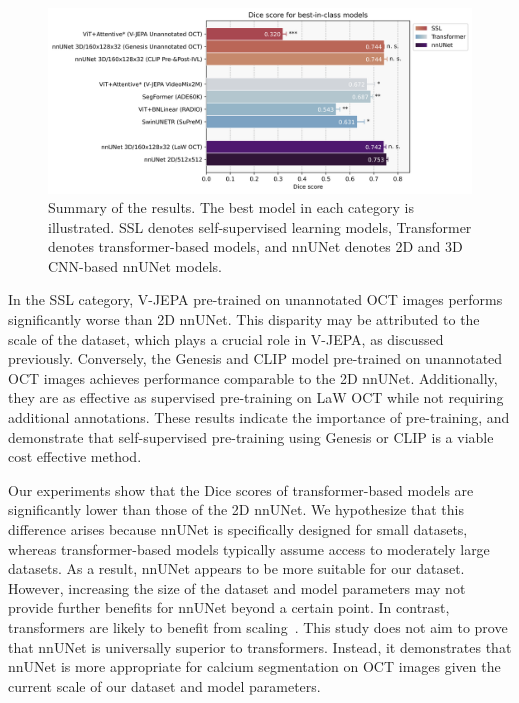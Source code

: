\documentclass[a4paper,11pt,oneside]{report}
\begin{document}
\begin{figure}[hbt]
    \centering
    \includegraphics[width=1\textwidth]{figures/result_best_in_class_results.png}
    \caption{Summary of the results. The best model in each category is illustrated. SSL denotes self-supervised learning models, Transformer denotes transformer-based models, and nnUNet denotes 2D and 3D CNN-based nnUNet models.}
    \label{fig:results}
\end{figure}

In the SSL category, V-JEPA pre-trained on unannotated OCT images performs significantly worse than 2D nnUNet. This disparity may be attributed to the scale of the dataset, which plays a crucial role in V-JEPA, as discussed previously. Conversely, the Genesis and CLIP model pre-trained on unannotated OCT images achieves performance comparable to the 2D nnUNet. Additionally, they are as effective as supervised pre-training on LaW OCT while not requiring additional annotations. These results indicate the importance of pre-training, and demonstrate that self-supervised pre-training using Genesis or CLIP is a viable cost effective method.

Our experiments show that the Dice scores of transformer-based models are significantly lower than those of the 2D nnUNet. We hypothesize that this difference arises because nnUNet is specifically designed for small datasets, whereas transformer-based models typically assume access to moderately large datasets. As a result, nnUNet appears to be more suitable for our dataset.
However, increasing the size of the dataset and model parameters may not provide further benefits for nnUNet beyond a certain point. In contrast, transformers are likely to benefit from scaling~\cite{Zhai2021}. This study does not aim to prove that nnUNet is universally superior to transformers. Instead, it demonstrates that nnUNet is more appropriate for calcium segmentation on OCT images given the current scale of our dataset and model parameters.
\end{document}

